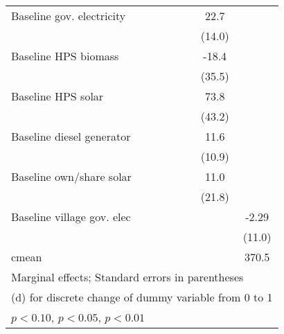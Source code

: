 \begin{table}[htbp]
\begin{tabular*}{1\hsize}{@{\hskip\tabcolsep\extracolsep\fill}l*{6}{c}}
Baseline gov. electricity&                  &                  &                  &                  &     22.7         &                  \\
                &                  &                  &                  &                  &   (14.0)         &                  \\
Baseline HPS biomass&                  &                  &                  &                  &    -18.4         &                  \\
                &                  &                  &                  &                  &   (35.5)         &                  \\
Baseline HPS solar&                  &                  &                  &                  &     73.8\sym{*}  &                  \\
                &                  &                  &                  &                  &   (43.2)         &                  \\
Baseline diesel generator&                  &                  &                  &                  &     11.6         &                  \\
                &                  &                  &                  &                  &   (10.9)         &                  \\
Baseline own/share solar&                  &                  &                  &                  &     11.0         &                  \\
                &                  &                  &                  &                  &   (21.8)         &                  \\
Baseline village gov. elec&                  &                  &                  &                  &                  &    -2.29         \\
                &                  &                  &                  &                  &                  &   (11.0)         \\
\midrule
cmean           &                  &                  &                  &                  &                  &    370.5         \\
\bottomrule
\multicolumn{7}{l}{\footnotesize Marginal effects; Standard errors in parentheses}\\
\multicolumn{7}{l}{\footnotesize  (d) for discrete change of dummy variable from 0 to 1}\\
\multicolumn{7}{l}{\footnotesize \sym{*} \(p<0.10\), \sym{**} \(p<0.05\), \sym{***} \(p<0.01\)}\\
\end{tabular*}
\end{table}
